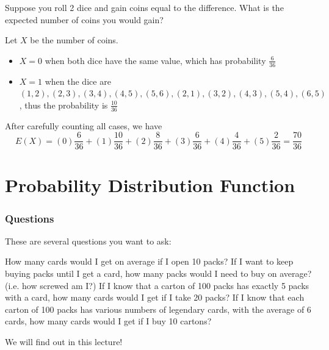 \begin{frame}[t]
\begin{ex}
Suppose you roll 2 dice and gain coins equal to the difference. What is the expected number of coins you would gain?
\end{ex}
\begin{sol}
Let $X$ be the number of coins.
\begin{itemize}
\item $X=0$ when both dice have the same value, which has probability $\frac{6}{36}$
\item $X=1$ when the dice are $(1,2), (2,3), (3,4), (4,5), (5,6), (2,1), (3,2) , (4,3), (5,4), (6,5)$, thus the probability is $\frac{10}{36}$
\end{itemize}
After carefully counting all cases, we have
\[E(X) = (0) \frac{6}{36} + (1) \frac{10}{36} + (2) \frac{8}{36} + (3) \frac{6}{36} + (4) \frac{4}{36} + (5) \frac{2}{36} = \frac{70}{36}\]
\end{sol}
\end{frame}

\section[Prob Dist Func]{Probability Distribution Function}
\frame{\sectionpage}

\begin{frame}
\frametitle{Questions}
 These are several questions you want to ask:
\begin{tasks}[label = $\circ$]
\task How many  cards would I get on average if I open 10 packs?
\task If I want to keep buying packs until I get a  card, how many packs would I need to buy on average? (i.e. how screwed am I?)
\task If I know that a carton of 100 packs has exactly 5 packs with a  card, how many  cards would I get if I take 20 packs? 
\task If I know that each carton of 100 packs has various numbers of legendary cards, with the average of 6 cards, how many  cards would I get if I buy 10 cartons?
\end{tasks}
We will find out in this lecture!
\end{frame}

